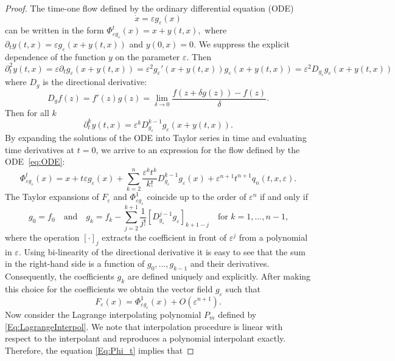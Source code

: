 \documentclass[a4paper,12pt]{article}
\begin{document}
\begin{proof}
The time-one flow defined by the ordinary differential equation (ODE)
\begin{equation}\label{eq:ODE}
\dot x=\varepsilon  g_\varepsilon(x)
\end{equation}
can be written in the form
\(\Phi_{\varepsilon g_\varepsilon}^t(x)=x+y(t,x),
\) 
where $\partial _ty(t,x)=\varepsilon g_\varepsilon(x+y(t,x))$
and $y(0,x)=0$. We suppress the explicit dependence of the function $y$ on the parameter $\varepsilon$.
Then 
\[
\partial_t^2y(t,x)=\varepsilon\partial_t  g_\varepsilon(x+y(t,x))=\varepsilon^2 g_\varepsilon'(x+y(t,x))g_\varepsilon(x+y(t,x))
=\varepsilon^2 D_{g_\varepsilon }g_\varepsilon (x+y(t,x)) 
\]
where $D_g$ is the directional derivative:
\[
D_gf(z)=f'(z)g(z)=\lim_{\delta\to0} \frac{f(z+\delta g(z))-f(z)}{\delta}.
\]
Then  for all $k$
\[
\partial_t^k y(t,x)
=\varepsilon^k D_{g_\varepsilon }^{k-1}g_\varepsilon (x+y(t,x)) .
\]
By expanding the solutions of the ODE into Taylor series in time
and evaluating time derivatives at $t=0$,
we arrive to an expression for the flow defined by the ODE~\eqref{eq:ODE}:
\begin{equation}\label{Eq:Phi_t}
\Phi^t_{\varepsilon g_\varepsilon}(x)=x+t\varepsilon g_\varepsilon(x)+\sum_{k=2}^{n} 
\frac{\varepsilon^k t^k}{k!}D_{g_\varepsilon}^{k-1}g_\varepsilon(x)+\varepsilon^{n+1}t^{n+1}q_n(t,x,\varepsilon)
.
\end{equation}
The Taylor expansions of $F_\varepsilon$ and $\Phi^1_{\varepsilon g_\varepsilon}$ coincide up to the order of $\varepsilon^n$
if and only if
\[
g_0=f_0\quad\text{and}\quad g_k=f_k-\sum_{j=2}^{k+1}\frac{1}{j!}\left[D_{g_\varepsilon}^{j-1}g_\varepsilon\right]_{k+1-j}
\quad\mbox{for $k=1,\ldots,n-1$,}
\]
where the operation $[\cdot]_j$ extracts the coefficient 
in front of $\varepsilon^j$ from a polynomial  in $\varepsilon$.
Using bi-linearity of the directional derivative it is easy to see that 
the sum in the right-hand side is a function of $g_0,\ldots,g_{k-1}$ and their derivatives. 
Consequently, the coefficients $g_k$ are defined uniquely and explicitly. 
After making this choice for the coefficients we obtain the vector field $g_\varepsilon$ such that
\[
F_\varepsilon(x)=\Phi^1_{\varepsilon g_\varepsilon}(x)+O(\varepsilon^{n+1}).
\]
Now consider the Lagrange interpolating polynomial $P_m$ defined by \eqref{Eq:LagrangeInterpol}.
We note that interpolation procedure is linear with respect to the interpolant 
and reproduces a polynomial interpolant exactly. 
Therefore, the equation \eqref{Eq:Phi_t} implies that 

\end{proof}
\end{document}
